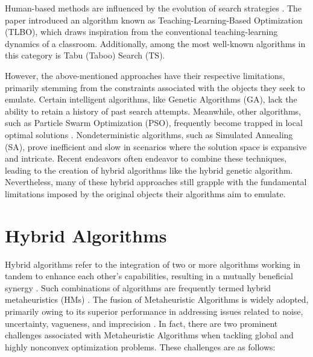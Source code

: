 \documentclass[conference]{IEEEtran}
\begin{document}
\begin{abstract1}
Human-based methods are influenced by the evolution of search strategies \cite{human}.  The paper\cite{Rao2012} introduced an algorithm known as Teaching-Learning-Based Optimization (TLBO), which draws inspiration from the conventional teaching-learning dynamics of a classroom. Additionally, among the most well-known algorithms in this category is Tabu (Taboo) Search (TS).

However, the above-mentioned approaches have their respective limitations, primarily stemming from the constraints associated with the objects they seek to emulate. Certain intelligent algorithms, like Genetic Algorithms (GA), lack the ability to retain a history of past search attempts. Meanwhile, other algorithms, such as Particle Swarm Optimization (PSO), frequently become trapped in local optimal solutions\cite{Zhuo2014} . Nondeterministic algorithms, such as Simulated Annealing (SA), prove inefficient and slow in scenarios where the solution space is expansive and intricate. Recent endeavors often endeavor to combine these techniques, leading to the creation of hybrid algorithms like the hybrid genetic algorithm. Nevertheless, many of these hybrid approaches still grapple with the fundamental limitations imposed by the original objects their algorithms aim to emulate.



\section{Hybrid Algorithms}
Hybrid algorithms refer to the integration of two or more algorithms working in tandem to enhance each other's capabilities, resulting in a mutually beneficial synergy \cite{Rodriguez2012}. Such combinations of algorithms are frequently termed hybrid metaheuristics (HMs) \cite{talbi2002taxonomy}.
The fusion of Metaheuristic Algorithms is widely adopted, primarily owing to its superior performance in addressing issues related to noise, uncertainty, vagueness, and imprecision  \cite{Grosan2007,Preux1999}. In fact, there are two prominent challenges associated with Metaheuristic Algorithms when tackling global and highly nonconvex optimization problems. These challenges are as follows:


\end{abstract1}
\end{document}
